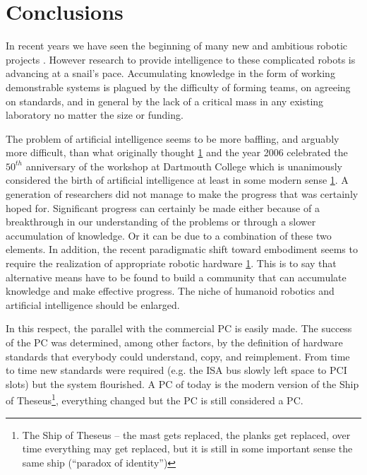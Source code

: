 
\section{Conclusions}

In recent years we have seen the beginning of many new and 
ambitious robotic projects 
\cite{02-c59-Hirai-1998,02-c59-Kaneko-2004,adams00humanoid,02-c59-Sakagami-2002}. 
%
However research to provide intelligence 
to these complicated robots is advancing at a snail's pace.
%
Accumulating knowledge in the form of working demonstrable systems is 
plagued by the difficulty of forming teams, on agreeing on standards, and 
in general by the lack of a critical mass in any existing laboratory no 
matter the size or funding. 

The problem of artificial intelligence seems to be more baffling, and 
arguably more difficult, than what originally thought \ref{} and the year 2006 
celebrated the $50^{th}$ anniversary of the workshop at Dartmouth College
which is unanimously considered the birth of artificial intelligence at 
least in some modern sense \ref{}. %
A generation of researchers did not manage to make the progress that was
certainly hoped for. Significant progress can certainly be made either 
because of a breakthrough in our understanding of the problems or through 
a slower accumulation of knowledge. Or it can be due to a combination of 
these two elements. In addition, the recent paradigmatic shift toward 
embodiment seems to require the realization of appropriate robotic 
hardware \ref{}. 
This is to say that alternative means have to be found to build a community
that can accumulate knowledge and make effective progress. The niche of
humanoid robotics and artificial intelligence should be enlarged.

In this respect, the parallel with the commercial PC is easily made. 
The success of the PC was determined, among other factors, by the definition 
of hardware standards that everybody could understand, copy, and reimplement. 
From time to time new standards were required (e.g. the ISA bus slowly left
space to PCI slots) but the system flourished. A PC of today is the modern 
version of the Ship of Theseus\footnote{The Ship of 
Theseus -- the mast gets replaced,
the planks get replaced, over time everything may get replaced,
but it is still in some important sense the same ship (``paradox
of identity'')}, everything changed but the PC is still considered
a PC. 
%

